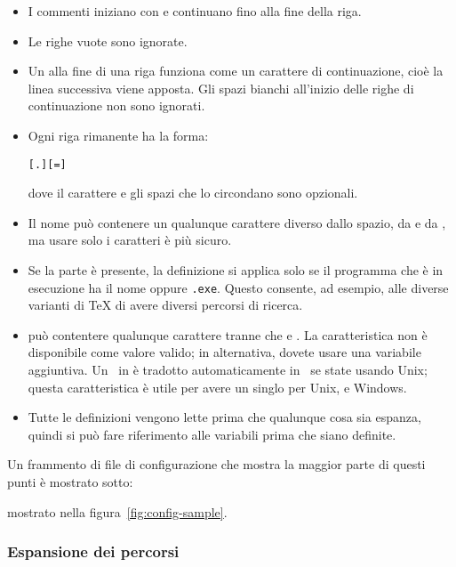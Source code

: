 \documentclass{article}
\begin{document}
\begin{itemize}
\item
  I commenti iniziano con \code{\%} e continuano fino alla fine della
  riga.
\item
  Le righe vuote sono ignorate.
\item
  Un \bs{} alla fine di una riga funziona come un carattere di
  continuazione, cioè la linea successiva viene apposta. Gli spazi bianchi
  all'inizio delle righe di continuazione non sono ignorati.
\item
  Ogni riga rimanente ha la forma:
\begin{alltt}
  [.] [=] 
\end{alltt}
  dove il carattere \samp{=} e gli spazi che lo circondano sono opzionali.
\item
  Il nome  può contenere un qualunque carattere diverso
  dallo spazio, da \samp{=} e da , ma usare solo i caratteri
   è più sicuro.
\item
  Se la parte  è presente, la definizione si
  applica solo se il programma che è in esecuzione ha il nome
  \texttt{} oppure \texttt{.exe}.
  Questo consente, ad esempio, alle diverse varianti di \TeX{} di avere
  diversi percorsi di ricerca.
\item {} può contentere qualunque carattere tranne che \code{\%}
  e . La caratteristica 
  non è disponibile come valore valido; in alternativa, dovete usare una
  variabile aggiuntiva. Un \samp{;}\ in  è tradotto
  automaticamente in \samp{:}\ se state usando Unix; questa caratteristica
  è utile per avere un singlo  per Unix,  e
  Windows.
\item
  Tutte le definizioni vengono lette prima che qualunque cosa sia espanza,
  quindi si può fare riferimento alle variabili prima che siano definite.
\end{itemize}
Un frammento di file di configurazione che mostra la maggior parte di
questi punti è
\ifSingleColumn
mostrato sotto:


\else
mostrato nella figura~\ref{fig:config-sample}.
\fi

\subsubsection{Espansione dei percorsi}
\label{sec:path-expansion}
\end{document}
